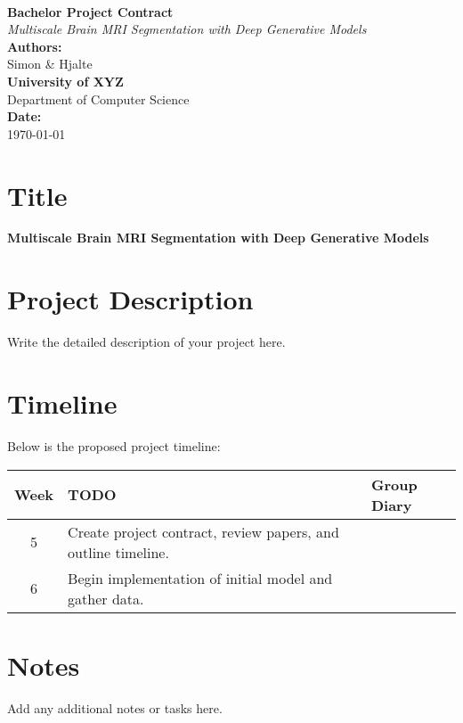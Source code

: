 \documentclass[12pt]{report}
\begin{document}
\begin{titlepage}
  \begin{center}
      \universitylogo \\[1cm] %
      \vspace{1cm}
      {\Huge \textbf{Bachelor Project Contract}} \\[0.5cm]
      {\Large \textit{Multiscale Brain MRI Segmentation with Deep Generative Models}} \\[2cm]
      {\Large \textbf{Authors:}} \\
      Simon \& Hjalte \\[1.5cm]
      {\Large \textbf{University of XYZ}} \\[0.5cm]
      {\Large Department of Computer Science} \\[1.5cm]
      {\Large \textbf{Date:}} \\
      \today
  \end{center}
  \vfill
\end{titlepage}

\pagestyle{fancy} %

\section*{Title}
\textbf{Multiscale Brain MRI Segmentation with Deep Generative Models}

\section*{Project Description}
Write the detailed description of your project here.

\section{Timeline}
Below is the proposed project timeline:
\vspace{1em}

\def\arraystretch{1.2} %
\noindent\begin{tabular}{|c|p{11cm}|p{4cm}|}
    \hline
    \textbf{Week} & \textbf{TODO} & \textbf{Group Diary} \\ \hline \hline
    5 & Create project contract, review papers, and outline timeline. & \\ \hline
    6 & Begin implementation of initial model and gather data. & \\ \hline
\end{tabular}

\section*{Notes}
Add any additional notes or tasks here.

 
 
\end{document}
